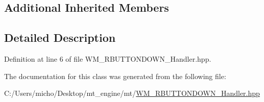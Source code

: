 \subsection*{Additional Inherited Members}


\subsection{Detailed Description}


Definition at line 6 of file W\+M\+\_\+\+R\+B\+U\+T\+T\+O\+N\+D\+O\+W\+N\+\_\+\+Handler.\+hpp.



The documentation for this class was generated from the following file\+:\begin{DoxyCompactItemize}
\item 
C\+:/\+Users/micho/\+Desktop/mt\+\_\+engine/mt/\hyperlink{_w_m___r_b_u_t_t_o_n_d_o_w_n___handler_8hpp}{W\+M\+\_\+\+R\+B\+U\+T\+T\+O\+N\+D\+O\+W\+N\+\_\+\+Handler.\+hpp}\end{DoxyCompactItemize}
